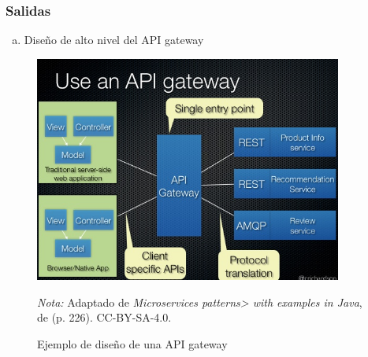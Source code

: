 \subsubsection*{Salidas}
\begin{enumerate}[a.]
  \item Diseño de alto nivel del API gateway
\end{enumerate}

\vspace{1em}
\begin{figure}[H]
  \caption{Ejemplo de diseño de una API gateway}
  \begin{center}
    \includegraphics[width=0.90\textwidth]{src/assets/metodologia/apigateway}
    \label{fig:api_gateway}
  \end{center}
  \textit{Nota:} Adaptado de \textit{Microservices patterns> with examples in Java}, de \cite{richardson2018microservices}
  (p. 226). CC-BY-SA-4.0.
\end{figure}

